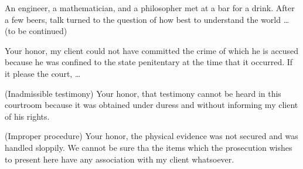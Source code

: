 \begin{joke}
An engineer, a mathematician, and a philosopher met
at a bar for a drink.  After a few beers, talk
turned to the question of how best to understand
the world …​ (to be continued)
\end{joke}

\begin{objection}
Your honor, my client could not have committed the
crime of which he is accused because he was
confined to the state penitentary at the time
that it occurred.  If it please the court, …​
\end{objection}
\begin{objection}
{\rm (Inadmissible testimony) }Your honor, that testimony cannot be
heard in this courtroom because it
was obtained under duress and without
informing my client of his rights.
\end{objection}
\begin{objection}
{\rm (Improper procedure) }Your honor, the physical evidence
was not secured and was handled sloppily.
We cannot be sure tha the items which
the prosecution wishes to present here
have any association with my client
whatsoever.
\end{objection}
